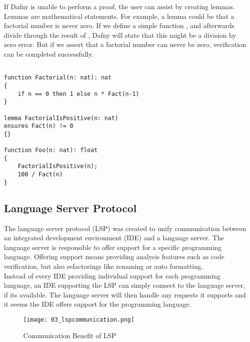 If Dafny is unable to perform a proof, the user can assist by creating lemmas.
Lemmas are mathematical statements.
For example, a lemma could be that a factorial number is never zero.
If we define a simple function , and afterwards divide through the result of , Dafny will state that this might be a division by zero error.
But if we assert that a factorial number can never be zero, verification can be completed successfully.
\begin{lstlisting}[language=dafny, caption={Lemmas}, captionpos=b, label={lst:lemma}]

function Factorial(n: nat): nat
{
    if n == 0 then 1 else n * Fact(n-1)
}

lemma FactorialIsPositive(n: nat)
ensures Fact(n) != 0
{}

function Foo(n: nat): float
{
    FactorialIsPositive(n);
    100 / Fact(n)
}
\end{lstlisting}

\subsection{Language Server Protocol}
The language server protocol (LSP) was created to unify communication between an integrated development environment (IDE) and a language server.
The language server is responsible to offer support for a specific programming language.
Offering support means providing analysis features such as code verification, but also refactorings like renaming or auto formatting.\\

Instead of every IDE providing individual support for each programming language, an IDE supporting the LSP can simply connect to the language server, if its available.
The language server will then handle any requests it supports and it seems the IDE offers support for the programming language.

\begin{figure}[H]
    \centering
    \texttt{[image: 03\_lspcommunication.png]}
    \caption{Communication Benefit of LSP}
    \label{fig:lspcommunication}
\end{figure}

